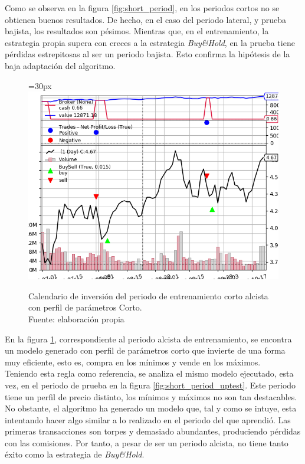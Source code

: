 Como se observa en la figura \ref{fig:short_period}, en los periodos cortos no se obtienen buenos resultados. De hecho, en el caso del periodo lateral, y prueba bajista, los resultados son p\'esimos. Mientras que, en el entrenamiento, la estrategia propia supera con creces a la estrategia \textit{Buy\&Hold}, en la prueba tiene p\'erdidas estrepitosas al ser un periodo bajista. Esto confirma la hip\'otesis de la baja adaptaci\'on del algoritmo.\\

     	\begin{figure}[H]
     		\centering\leftskip=30px
     		\includegraphics[scale=0.70]{imagenes/S_Short_train.png}
     		\caption[Calendario de inversi\'on del periodo de entrenamiento corto alcista.]{Calendario de inversi\'on del periodo de entrenamiento corto alcista con perfil de par\'ametros Corto.\\ Fuente: elaboraci\'on propia}
     		\label{fig:short_period_uptrain}
     	\end{figure}
     	
En la figura \ref{fig:short_period_uptrain}, correspondiente al periodo alcista de entrenamiento, se encontra un modelo generado con perfil de par\'ametros corto que invierte de una forma muy eficiente, esto es, compra en los m\'inimos y vende en los m\'aximos. \\

Teniendo esta regla como referencia, se analiza el mismo modelo ejecutado, esta vez, en el periodo de prueba en la figura \ref{fig:short_period_uptest}. Este periodo tiene un perfil de precio distinto, los m\'inimos y m\'aximos no son tan destacables. No obstante, el algoritmo ha generado un modelo que, tal y como se intuye, esta intentando hacer algo similar a lo realizado en el periodo del que aprendi\'o. Las primeras transacciones son torpes y demasiado abundantes, produciendo p\'erdidas con las comisiones.	Por tanto, a pesar de ser un periodo alcista, no tiene tanto \'exito como la estrategia de \textit{Buy\&Hold}.\\
     	
